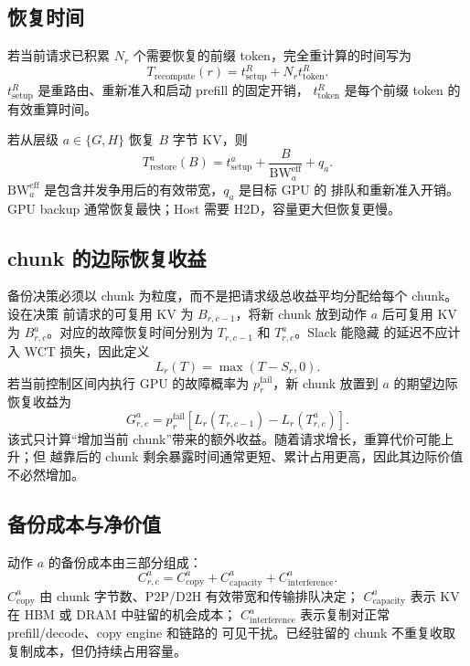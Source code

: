 \documentclass[UTF8,11pt,a4paper]{ctexart}
\begin{document}
\subsection{恢复时间}

若当前请求已积累 $N_r$ 个需要恢复的前缀 token，完全重计算的时间写为
\begin{equation}
  T_{\mathrm{recompute}}(r)
  =t_{\mathrm{setup}}^{R}+N_r t_{\mathrm{token}}^{R}.
  \label{eq:recompute}
\end{equation}
$t_{\mathrm{setup}}^{R}$ 是重路由、重新准入和启动 prefill 的固定开销，
$t_{\mathrm{token}}^{R}$ 是每个前缀 token 的有效重算时间。

若从层级 $a\in\{G,H\}$ 恢复 $B$ 字节 KV，则
\begin{equation}
  T_{\mathrm{restore}}^{a}(B)
  =t_{\mathrm{setup}}^{a}
  +\frac{B}{\mathrm{BW}_{a}^{\mathrm{eff}}}
  +q_a .
  \label{eq:restore}
\end{equation}
$\mathrm{BW}_{a}^{\mathrm{eff}}$ 是包含并发争用后的有效带宽，$q_a$ 是目标 GPU 的
排队和重新准入开销。GPU backup 通常恢复最快；Host 需要 H2D，容量更大但恢复更慢。

\subsection{chunk 的边际恢复收益}

备份决策必须以 chunk 为粒度，而不是把请求级总收益平均分配给每个 chunk。设在决策
前请求的可复用 KV 为 $B_{r,c-1}$，将新 chunk 放到动作 $a$ 后可复用 KV 为
$B_{r,c}^{a}$。对应的故障恢复时间分别为 $T_{r,c-1}$ 和 $T_{r,c}^{a}$。Slack 能隐藏
的延迟不应计入 WCT 损失，因此定义
\begin{equation}
  L_r(T)=\max(T-S_r,0).
  \label{eq:visible-loss}
\end{equation}
若当前控制区间内执行 GPU 的故障概率为 $p_r^{\mathrm{fail}}$，新 chunk 放置到 $a$
的期望边际恢复收益为
\begin{equation}
  G_{r,c}^{a}
  =p_r^{\mathrm{fail}}
  \left[L_r(T_{r,c-1})-L_r(T_{r,c}^{a})\right].
  \label{eq:recovery-benefit}
\end{equation}
该式只计算“增加当前 chunk”带来的额外收益。随着请求增长，重算代价可能上升；但
越靠后的 chunk 剩余暴露时间通常更短、累计占用更高，因此其边际价值不必然增加。

\subsection{备份成本与净价值}

动作 $a$ 的备份成本由三部分组成：
\begin{equation}
  C_{r,c}^{a}
  =C_{\mathrm{copy}}^{a}
  +C_{\mathrm{capacity}}^{a}
  +C_{\mathrm{interference}}^{a}.
  \label{eq:backup-cost}
\end{equation}
$C_{\mathrm{copy}}^{a}$ 由 chunk 字节数、P2P/D2H 有效带宽和传输排队决定；
$C_{\mathrm{capacity}}^{a}$ 表示 KV 在 HBM 或 DRAM 中驻留的机会成本；
$C_{\mathrm{interference}}^{a}$ 表示复制对正常 prefill/decode、copy engine 和链路的
可见干扰。已经驻留的 chunk 不重复收取复制成本，但仍持续占用容量。
\end{document}
